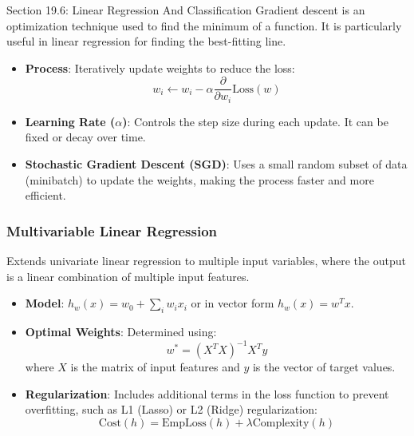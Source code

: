 \begin{notes}{Section 19.6: Linear Regression And Classification}
    Gradient descent is an optimization technique used to find the minimum of a function. It is particularly useful in linear regression for finding the best-fitting line.
    
    \begin{highlight}
    
        \begin{itemize}
            \item \textbf{Process}: Iteratively update weights to reduce the loss:
            \[
            w_i \leftarrow w_i - \alpha \frac{\partial}{\partial w_i} \text{Loss}(w)
            \]
            \item \textbf{Learning Rate ($\alpha$)}: Controls the step size during each update. It can be fixed or decay over time.
            \item \textbf{Stochastic Gradient Descent (SGD)}: Uses a small random subset of data (minibatch) to update the weights, making the process faster and more efficient.
        \end{itemize}
    
    \end{highlight}
    
    \subsubsection*{Multivariable Linear Regression}
    
    Extends univariate linear regression to multiple input variables, where the output is a linear combination of multiple input features.
    
    \begin{highlight}
    
        \begin{itemize}
            \item \textbf{Model}: $h_w(x) = w_0 + \sum_{i} w_i x_i$ or in vector form $h_w(x) = w^T x$.
            \item \textbf{Optimal Weights}: Determined using:
            \[
            w^* = (X^TX)^{-1}X^Ty
            \]
            where $X$ is the matrix of input features and $y$ is the vector of target values.
            \item \textbf{Regularization}: Includes additional terms in the loss function to prevent overfitting, such as L1 (Lasso) or L2 (Ridge) regularization:
            \[
            \text{Cost}(h) = \text{EmpLoss}(h) + \lambda \text{Complexity}(h)
            \]
        \end{itemize}
    

\end{highlight}
\end{notes}
